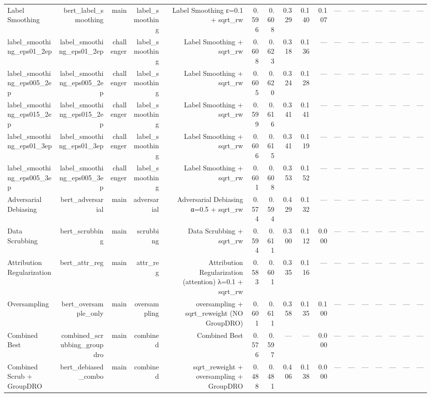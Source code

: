 \begin{tabular}{lrrrrrrrrrrrrrrrr}
Label Smoothing & bert\_label\_smoothing & main & label\_smoothing & Label Smoothing ε=0.1 + sqrt\_rw & 0.596 & 0.608 & 0.329 & 0.140 & 0.107 & --- & --- & --- & --- & --- & --- & --- \\
label\_smoothing\_eps01\_2ep & label\_smoothing\_eps01\_2ep & challenger & label\_smoothing & Label Smoothing + sqrt\_rw & 0.608 & 0.623 & 0.318 & 0.136 & --- & --- & --- & --- & --- & --- & --- & --- \\
label\_smoothing\_eps005\_2ep & label\_smoothing\_eps005\_2ep & challenger & label\_smoothing & Label Smoothing + sqrt\_rw & 0.605 & 0.620 & 0.324 & 0.128 & --- & --- & --- & --- & --- & --- & --- & --- \\
label\_smoothing\_eps015\_2ep & label\_smoothing\_eps015\_2ep & challenger & label\_smoothing & Label Smoothing + sqrt\_rw & 0.599 & 0.616 & 0.341 & 0.141 & --- & --- & --- & --- & --- & --- & --- & --- \\
label\_smoothing\_eps01\_3ep & label\_smoothing\_eps01\_3ep & challenger & label\_smoothing & Label Smoothing + sqrt\_rw & 0.606 & 0.615 & 0.341 & 0.119 & --- & --- & --- & --- & --- & --- & --- & --- \\
label\_smoothing\_eps005\_3ep & label\_smoothing\_eps005\_3ep & challenger & label\_smoothing & Label Smoothing + sqrt\_rw & 0.601 & 0.608 & 0.353 & 0.152 & --- & --- & --- & --- & --- & --- & --- & --- \\
Adversarial Debiasing & bert\_adversarial & main & adversarial & Adversarial Debiasing α=0.5 + sqrt\_rw & 0.574 & 0.594 & 0.429 & 0.132 & --- & --- & --- & --- & --- & --- & --- & --- \\
Data Scrubbing & bert\_scrubbing & main & scrubbing & Data Scrubbing + sqrt\_rw & 0.594 & 0.611 & 0.300 & 0.112 & 0.000 & --- & --- & --- & --- & --- & --- & --- \\
Attribution Regularization & bert\_attr\_reg & main & attr\_reg & Attribution Regularization (attention) λ=0.1 + sqrt\_rw & 0.583 & 0.601 & 0.335 & 0.116 & --- & --- & --- & --- & --- & --- & --- & --- \\
Oversampling & bert\_oversample\_only & main & oversampling & oversampling + sqrt\_reweight (NO GroupDRO) & 0.601 & 0.611 & 0.358 & 0.135 & 0.100 & --- & --- & --- & --- & --- & --- & --- \\
Combined Best & combined\_scrubbing\_groupdro & main & combined & Combined Best & 0.576 & 0.597 & --- & --- & 0.000 & --- & --- & --- & --- & --- & --- & --- \\
Combined Scrub + GroupDRO & bert\_debiased\_combo & main & combined & sqrt\_reweight + oversampling + GroupDRO & 0.488 & 0.481 & 0.406 & 0.138 & 0.000 & --- & --- & --- & --- & --- & --- & --- \\

\end{tabular}
